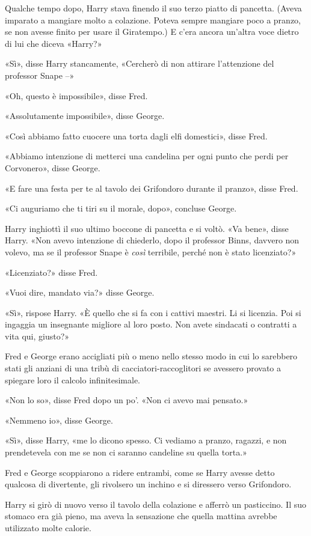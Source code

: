 Qualche tempo dopo, Harry stava finendo il suo terzo piatto di pancetta. (Aveva imparato a mangiare molto a colazione. Poteva sempre mangiare poco a pranzo, se non avesse finito per usare il Giratempo.) E c’era ancora un’altra voce dietro di lui che diceva «Harry?»

«Sì», disse Harry stancamente, «Cercherò di non attirare l’attenzione del professor Snape –»

«Oh, questo è impossibile», disse Fred.

«Assolutamente impossibile», disse George.

«Così abbiamo fatto cuocere una torta dagli elfi domestici», disse Fred.

«Abbiamo intenzione di metterci una candelina per ogni punto che perdi per Corvonero», disse George.

«E fare una festa per te al tavolo dei Grifondoro durante il pranzo», disse Fred.

«Ci auguriamo che ti tiri su il morale, dopo», concluse George.

Harry inghiottì il suo ultimo boccone di pancetta e si voltò. «Va bene», disse Harry. «Non avevo intenzione di chiederlo, dopo il professor Binns, davvero non volevo, ma se il professor Snape è \textit{così} terribile, perché non è stato licenziato?»

«Licenziato?» disse Fred.

«Vuoi dire, mandato via?» disse George.

«Sì», rispose Harry. «È quello che si fa con i cattivi maestri. Li si licenzia. Poi si ingaggia un insegnante migliore al loro posto. Non avete sindacati o contratti a vita qui, giusto?»

Fred e George erano accigliati più o meno nello stesso modo in cui lo sarebbero stati gli anziani di una tribù di cacciatori-raccoglitori se avessero provato a spiegare loro il calcolo infinitesimale.

«Non lo so», disse Fred dopo un po’. «Non ci avevo mai pensato.»

«Nemmeno io», disse George.

«Sì», disse Harry, «me lo dicono spesso. Ci vediamo a pranzo, ragazzi, e non prendetevela con me se non ci saranno candeline su quella torta.»

Fred e George scoppiarono a ridere entrambi, come se Harry avesse detto qualcosa di divertente, gli rivolsero un inchino e si diressero verso Grifondoro.

Harry si girò di nuovo verso il tavolo della colazione e afferrò un pasticcino. Il suo stomaco era già pieno, ma aveva la sensazione che quella mattina avrebbe utilizzato molte calorie.

